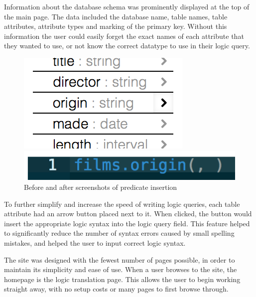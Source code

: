 \documentclass[a4paper, 11pt]{article}
\begin{document}
      Information about the database schema was prominently displayed at the top
      of the main page. The data included the database name, table names, table
      attributes, attribute types and marking of the primary key. Without this
      information the user could easily forget the exact names of each attribute
      that they wanted to use, or not know the correct datatype to use in their
      logic query.

      \begin{figure}[h!]
        \centering
        \begin{minipage}{0.49\textwidth}
          \centering
          \includegraphics[]{images/site_schema_insert.png}
        \end{minipage}%
        \begin{minipage}{0.49\textwidth}
          \centering
          \includegraphics[width=\textwidth]{images/site_schema_inserted.png}
        \end{minipage}
        \caption{Before and after screenshots of predicate insertion}
      \end{figure}

      To further simplify and increase the speed of writing logic queries,
      each table attribute had an arrow button placed next to it. When clicked,
      the button would insert the appropriate logic syntax into the logic query
      field. This feature helped to significantly reduce the number of syntax
      errors caused by small spelling mistakes, and helped the user to input
      correct logic syntax.

      The site was designed with the fewest number of pages possible, in order
      to maintain its simplicity and ease of use. When a user browses to the
      site, the homepage is the logic translation page. This allows the user to
      begin working straight away, with no setup costs or many pages to first
      browse through.
\end{document}
